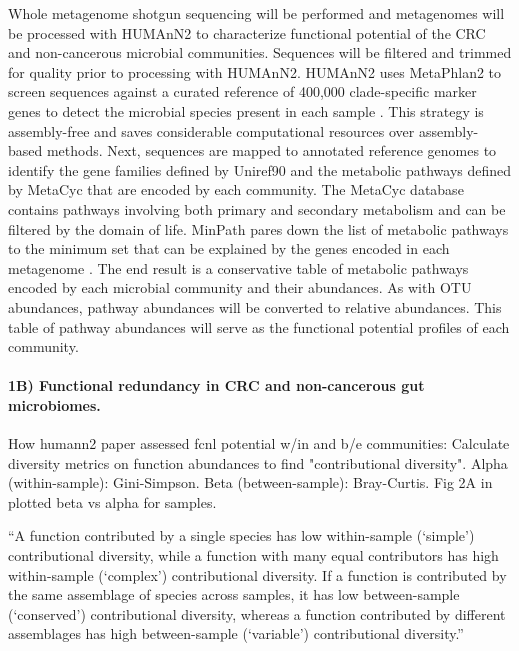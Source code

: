 \documentclass[11pt]{article}
\begin{document}
Whole metagenome shotgun sequencing will be performed and metagenomes will be processed with HUMAnN2 \cite{franzosa_species-level_2018} to characterize functional potential of the CRC and non-cancerous microbial communities.
Sequences will be filtered and trimmed for quality prior to processing with HUMAnN2.
HUMAnN2 uses MetaPhlan2 to screen sequences against a curated reference of 400,000 clade-specific marker genes to detect the microbial species present in each sample \cite{segata_metagenomic_2012}.
This strategy is assembly-free and saves considerable computational resources over assembly-based methods.
Next, sequences are mapped to annotated reference genomes to identify the gene families defined by Uniref90 and the metabolic pathways defined by MetaCyc \cite{capsi_metacyc_2017} that are encoded by each community.
The MetaCyc database contains pathways involving both primary and secondary metabolism and can be filtered by the domain of life.
MinPath pares down the list of metabolic pathways to the minimum set that can be explained by the genes encoded in each metagenome \cite{ye_parsimony_2009}.
The end result is a conservative table of metabolic pathways encoded by each microbial community and their abundances.
As with OTU abundances, pathway abundances will be converted to relative abundances.
This table of pathway abundances will serve as the functional potential profiles of each community.


\paragraph{1B) Functional redundancy in CRC and non-cancerous gut microbiomes.}

How humann2 paper assessed fcnl potential w/in and b/e communities:
Calculate diversity metrics on function abundances to find "contributional diversity".
Alpha (within-sample): Gini-Simpson. Beta (between-sample): Bray-Curtis.
Fig 2A in \cite{franzosa_species-level_2018} plotted beta vs alpha for samples.

``A function contributed by a single species has low within-sample (‘simple’) contributional diversity, while a function with many equal contributors has high within-sample (‘complex’) contributional diversity. If a function is contributed by the same assemblage of species across samples, it has low between-sample (‘conserved’) contributional diversity, whereas a function contributed by different assemblages has high between-sample (‘variable’) contributional diversity.'' \cite{franzosa_species-level_2018}
\end{document}
